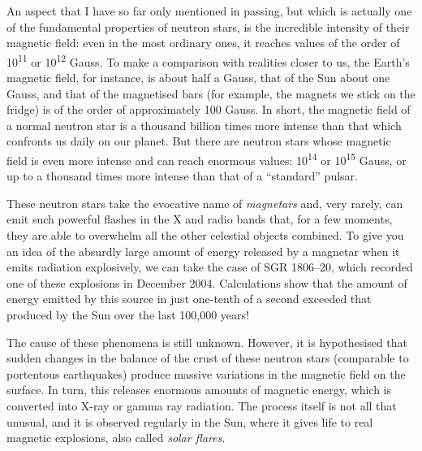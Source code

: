An aspect that I have so far only mentioned in passing, but which is actually one of the
fundamental properties of neutron stars, is the incredible intensity of their magnetic
field: even in the most ordinary ones, it reaches values of the order of
10\textsuperscript{11} or 10\textsuperscript{12}
Gauss. To make a comparison
with realities closer to us, the Earth's magnetic field, for instance, is about half a
Gauss, that of the Sun about one Gauss, and that of the magnetised bars (for example,
the magnets we stick on the fridge) is of the order of approximately 100 Gauss. In
short, the magnetic field of a normal neutron star is a thousand billion times more
intense than that which confronts us daily on our planet. But there are neutron stars
whose magnetic field is even more intense and can reach enormous values:
10\textsuperscript{14} or 10\textsuperscript{15} Gauss, or up to a thousand times more
intense than that of a ``standard'' pulsar.

These neutron stars take the evocative name of
\emph{magnetars} and, very rarely, can emit such
powerful flashes in the X and radio bands that, for a few moments, they are able to
overwhelm all the other celestial objects combined. To give you an idea of the absurdly
large amount of energy released by a magnetar when it emits radiation
explosively, we can take the case of SGR 1806--20, which recorded one
of these explosions in December 2004. Calculations show that the amount of energy
emitted by this source in just one-tenth of a second exceeded that produced by the Sun
over the last 100,000 years!

The cause of these phenomena is still unknown. However, it is hypothesised that sudden
changes in the balance of the crust of these neutron stars (comparable to portentous
earthquakes) produce massive variations in the magnetic field on the surface. In turn,
this releases enormous amounts of magnetic energy, which is converted
into X-ray or gamma ray radiation. The process itself is not all that
unusual, and it is observed regularly in the Sun, where it gives life to real magnetic
explosions, also called \emph{solar flares}.

